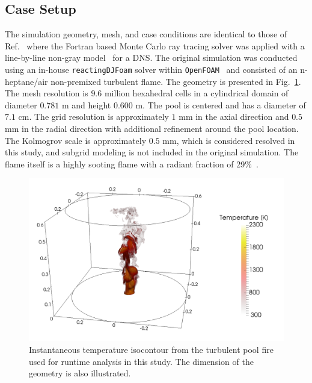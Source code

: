 \subsection{Case Setup}
The simulation geometry, mesh, and case conditions are identical to those of Ref.~\cite{Wu2020DetailedFire} where the Fortran based Monte Carlo ray tracing solver was applied with a line-by-line non-gray model~\cite{Ren2019Line-by-lineSystem} for a DNS. The original simulation was conducted using an in-house \texttt{reactingDJFoam} solver within \texttt{OpenFOAM}~\cite{Wu2019AFlame} and consisted of an n-heptane/air non-premixed turbulent flame. The geometry is presented in Fig.~\ref{fig:PoolFireVisual}. The mesh resolution is $9.6$ million hexahedral cells in a cylindrical domain of diameter $0.781$ m and height $0.600$ m. The pool is centered and has a diameter of $7.1$ cm. The grid resolution is approximately $1$ mm in the axial direction and $0.5$ mm in the radial direction with additional refinement around the pool location. The Kolmogrov scale is approximately $0.5$ mm, which is considered resolved in this study, and subgrid modeling is not included in the original simulation. 
The flame itself is a highly sooting flame with a radiant fraction of 29\%~\cite{Wu2020DetailedFire}. 


\begin{figure}[!b]
\centering
\includegraphics[width=0.8\linewidth]{figures/ch4/PoolFireVisual.png}
\caption{Instantaneous temperature isocontour from the turbulent pool fire used for runtime analysis in this study. The dimension of the geometry is also illustrated.}
\label{fig:PoolFireVisual}
\end{figure}



